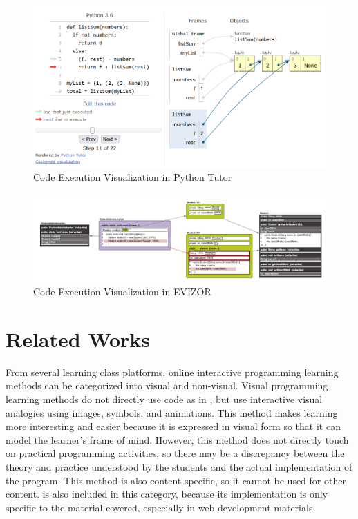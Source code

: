 \documentclass[conference]{IEEEtran}
\begin{document}
\begin{figure}[htbp]
  \centerline{\includegraphics[width=\linewidth]{chapter2/pythontutor.png}}
  \caption{Code Execution Visualization in Python Tutor} \label{fig:pythontutor}
\end{figure}

\begin{figure}[htbp]
  \centerline{\includegraphics[width=\linewidth]{chapter2/evizor.png}}
  \caption{Code Execution Visualization in EVIZOR} \label{fig:evizor}
\end{figure}

\section{Related Works}
From several learning class platforms, online interactive programming learning methods can be categorized into visual and non-visual. Visual programming learning methods do not directly use code as in \cite{brilliant2021media}, but use interactive visual analogies using images, symbols, and animations. This method makes learning more interesting and easier because it is expressed in visual form so that it can model the learner's frame of mind. However, this method does not directly touch on practical programming activities, so there may be a discrepancy between the theory and practice understood by the students and the actual implementation of the program. This method is also content-specific, so it cannot be used for other content. \cite{froggy2021media} is also included in this category, because its implementation is only specific to the material covered, especially in web development materials.
\end{document}
